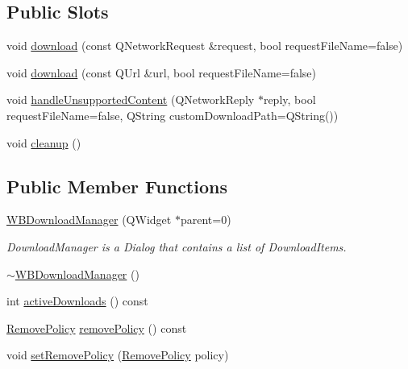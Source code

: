 \subsection*{Public Slots}
\begin{DoxyCompactItemize}
\item 
void \hyperlink{class_w_b_download_manager_a0f84a26b21d560bd1b319d2fc28de045}{download} (const Q\-Network\-Request \&request, bool request\-File\-Name=false)
\item 
void \hyperlink{class_w_b_download_manager_a4795a89cd67f04f5b8d5d1c6e4755c48}{download} (const Q\-Url \&url, bool request\-File\-Name=false)
\item 
void \hyperlink{class_w_b_download_manager_a5a77a673138269e511f8b5eba077c6c7}{handle\-Unsupported\-Content} (Q\-Network\-Reply $\ast$reply, bool request\-File\-Name=false, Q\-String custom\-Download\-Path=Q\-String())
\item 
void \hyperlink{class_w_b_download_manager_aa31322f2226526ab3577a90716a861be}{cleanup} ()
\end{DoxyCompactItemize}
\subsection*{Public Member Functions}
\begin{DoxyCompactItemize}
\item 
\hyperlink{class_w_b_download_manager_a0781b95191fdabe86c15f841ba6c4f0d}{W\-B\-Download\-Manager} (Q\-Widget $\ast$parent=0)
\begin{DoxyCompactList}\small\item\em Download\-Manager is a Dialog that contains a list of Download\-Items. \end{DoxyCompactList}\item 
\hyperlink{class_w_b_download_manager_ac3db8733c5e2726c82ddba10d8f47710}{$\sim$\-W\-B\-Download\-Manager} ()
\item 
int \hyperlink{class_w_b_download_manager_a0695a3b83db7886b53069ac2c12aab48}{active\-Downloads} () const 
\item 
\hyperlink{class_w_b_download_manager_ab10eb3722996f2a36c2778da4591f686}{Remove\-Policy} \hyperlink{class_w_b_download_manager_a4a8e3ea393bf1785df22de1a4e66362f}{remove\-Policy} () const 
\item 
void \hyperlink{class_w_b_download_manager_a5a5f33b920108d0a0d9e7fce091dd979}{set\-Remove\-Policy} (\hyperlink{class_w_b_download_manager_ab10eb3722996f2a36c2778da4591f686}{Remove\-Policy} policy)
\end{DoxyCompactItemize}
